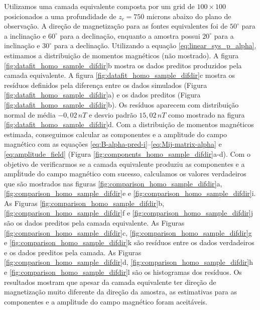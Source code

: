 Utilizamos uma camada equivalente composta por um grid de $100 \times 100$ posicionados a uma profundidade de $z_c = 750$ microns abaixo do plano de observação. A direção de magnetização para as fontes equivalentes foi de $50^\circ$ para a inclinação e $60^\circ$ para a declinação, enquanto a amostra possui $20^\circ$ para a inclinação e $30^\circ$ para a declinação. Utilizando a equação \ref{eq:linear_sys_p_alpha}, estimamos a distribuição de momentos magnéticos (não mostrado). A figura \ref{fig:datafit_homo_sample_difdir}b mostra os dados preditos produzidos pela camada equivalente. A figura \ref{fig:datafit_homo_sample_difdir}c mostra os resíduos definidos pela diferença entre os dados simulados (Figura \ref{fig:datafit_homo_sample_difdir}a) e os dados preditos (Figura \ref{fig:datafit_homo_sample_difdir}b). Os resíduos aparecem com distribuição normal de média $-0,02 \, nT$ e desvio padrão $15,02 \, nT$ como mostrado na figura \ref{fig:datafit_homo_sample_difdir}d. Com a distribuição de momentos magnéticos estimada, conseguimos calcular as componentes e a amplitude do campo magnético com as equações \ref{eq:B-alpha-pred-i}--\ref{eq:Mij-matrix-alpha} e \ref{eq:amplitude_field} (Figura \ref{fig:components_homo_sample_difdir}a-d). Com o objetivo de verificarmos se a camada equivalente produziu as componentes e a ampĺitude do campo magnético com sucesso, calculamos os valores verdadeiros que são mostrados nas  figuras \ref{fig:comparison_homo_sample_difdir}a, \ref{fig:comparison_homo_sample_difdir}e e \ref{fig:comparison_homo_sample_difdir}i. As Figuras \ref{fig:comparison_homo_sample_difdir}b, \ref{fig:comparison_homo_sample_difdir}f e \ref{fig:comparison_homo_sample_difdir}j são os dados preditos pela camada equivalente. As Figuras \ref{fig:comparison_homo_sample_difdir}c, \ref{fig:comparison_homo_sample_difdir}g e \ref{fig:comparison_homo_sample_difdir}k são resíduos entre os dados verdadeiros e os dados preditos pela camada. As Figuras \ref{fig:comparison_homo_sample_difdir}d, \ref{fig:comparison_homo_sample_difdir}h e \ref{fig:comparison_homo_sample_difdir}l são os histogramas dos resíduos. Os resultados mostram que apesar da camada equivalente ter direção de magnetização muito diferente da direção da amostra, as estimativas para as componentes e a amplitude do campo magnético foram aceitáveis.  


